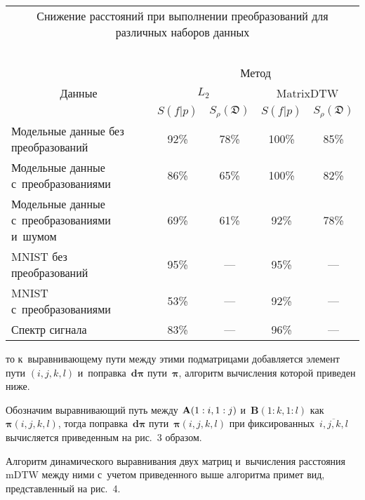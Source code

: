 \begin{multicols}{2}
\begin{table*}[b]\small
\begin{center}
\begin{tabular}{|l|c|c|c|c|}
\multicolumn{5}{c}{Снижение расстояний при выполнении преобразований 
для различных наборов данных}\\
\multicolumn{5}{c}{\ }\\[-6pt]
\hline
 &\multicolumn{4}{c|}{Метод}\\
 \cline{2-5}
\multicolumn{1}{|c|}{Данные}  & \multicolumn{2}{c|}{$L_2$} & \multicolumn{2}{c|}{MatrixDTW} \\
\cline{2-5}
& $S(f|p)$  &  $S_{\rho}(\mathfrak{D})$ &  $S(f|p)$ & $S_{\rho}(\mathfrak{D})$ \\
\hline
Модельные данные без преобразований& 92\% & 78\% & 100\%\hphantom{9} & 85\% \\
Модельные данные с~преобразованиями & 86\% & 65\% &  100\%\hphantom{9} & 82\% \\
Модельные данные с~преобразованиями и~шумом& 69\% & 61\% &  92\% & 78\% \\
MNIST без преобразований& 95\% & --- & 95\% & --- \\
MNIST с~преобразованиями & 53\% & --- & 92\% & --- \\
Спектр сигнала& 83\% & --- & 96\% & --- \\
\hline
\end{tabular}
\end{center}
\end{table*}

\noindent
то к~выравнивающему пути между этими под\-мат\-ри\-ца\-ми 
добавляется элемент пути $(i,j,k,l)$ и~поправка~$\boldsymbol{d\pi} $ 
пути~$\boldsymbol{\pi}$, алгоритм вычисления которой приведен ниже.

Обозначим выравнивающий путь между $\textbf{A}(1:i,\linebreak 1:j)$
 и~$\textbf{B}(1:k,1:l)$ как~$\boldsymbol{\pi}(i,j,k,l)$, тогда 
 поправка~$\boldsymbol{d\pi} $ пути~$\boldsymbol{\pi}(i,j,k,l)$ 
 при фиксированных~$\overline{i,j,k,l}$ вычисляется приведенным на рис.~3 
 образом.





Алгоритм динамического выравнивания двух матриц и~вычисления 
расстояния $\mathrm{mDTW}$ между ними с~учетом приведенного выше 
алгоритма примет вид, представленный на рис.~4.






\end{multicols}
